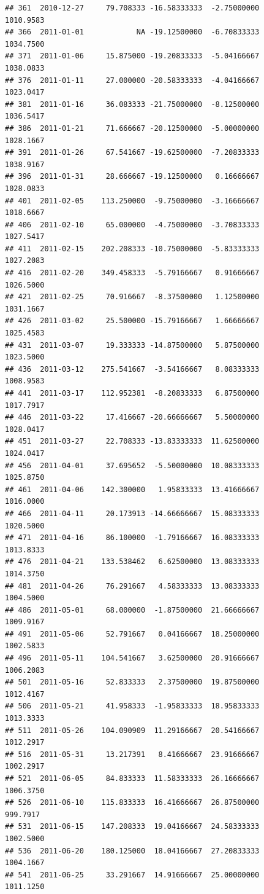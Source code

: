 \documentclass[
]{article}
\begin{document}
\begin{verbatim}
## 361  2010-12-27     79.708333 -16.58333333  -2.75000000    1010.9583
## 366  2011-01-01            NA -19.12500000  -6.70833333    1034.7500
## 371  2011-01-06     15.875000 -19.20833333  -5.04166667    1038.0833
## 376  2011-01-11     27.000000 -20.58333333  -4.04166667    1023.0417
## 381  2011-01-16     36.083333 -21.75000000  -8.12500000    1036.5417
## 386  2011-01-21     71.666667 -20.12500000  -5.00000000    1028.1667
## 391  2011-01-26     67.541667 -19.62500000  -7.20833333    1038.9167
## 396  2011-01-31     28.666667 -19.12500000   0.16666667    1028.0833
## 401  2011-02-05    113.250000  -9.75000000  -3.16666667    1018.6667
## 406  2011-02-10     65.000000  -4.75000000  -3.70833333    1027.5417
## 411  2011-02-15    202.208333 -10.75000000  -5.83333333    1027.2083
## 416  2011-02-20    349.458333  -5.79166667   0.91666667    1026.5000
## 421  2011-02-25     70.916667  -8.37500000   1.12500000    1031.1667
## 426  2011-03-02     25.500000 -15.79166667   1.66666667    1025.4583
## 431  2011-03-07     19.333333 -14.87500000   5.87500000    1023.5000
## 436  2011-03-12    275.541667  -3.54166667   8.08333333    1008.9583
## 441  2011-03-17    112.952381  -8.20833333   6.87500000    1017.7917
## 446  2011-03-22     17.416667 -20.66666667   5.50000000    1028.0417
## 451  2011-03-27     22.708333 -13.83333333  11.62500000    1024.0417
## 456  2011-04-01     37.695652  -5.50000000  10.08333333    1025.8750
## 461  2011-04-06    142.300000   1.95833333  13.41666667    1016.0000
## 466  2011-04-11     20.173913 -14.66666667  15.08333333    1020.5000
## 471  2011-04-16     86.100000  -1.79166667  16.08333333    1013.8333
## 476  2011-04-21    133.538462   6.62500000  13.08333333    1014.3750
## 481  2011-04-26     76.291667   4.58333333  13.08333333    1004.5000
## 486  2011-05-01     68.000000  -1.87500000  21.66666667    1009.9167
## 491  2011-05-06     52.791667   0.04166667  18.25000000    1002.5833
## 496  2011-05-11    104.541667   3.62500000  20.91666667    1006.2083
## 501  2011-05-16     52.833333   2.37500000  19.87500000    1012.4167
## 506  2011-05-21     41.958333  -1.95833333  18.95833333    1013.3333
## 511  2011-05-26    104.090909  11.29166667  20.54166667    1012.2917
## 516  2011-05-31     13.217391   8.41666667  23.91666667    1002.2917
## 521  2011-06-05     84.833333  11.58333333  26.16666667    1006.3750
## 526  2011-06-10    115.833333  16.41666667  26.87500000     999.7917
## 531  2011-06-15    147.208333  19.04166667  24.58333333    1002.5000
## 536  2011-06-20    180.125000  18.04166667  27.20833333    1004.1667
## 541  2011-06-25     33.291667  14.91666667  25.00000000    1011.1250

\end{verbatim}
\end{document}
